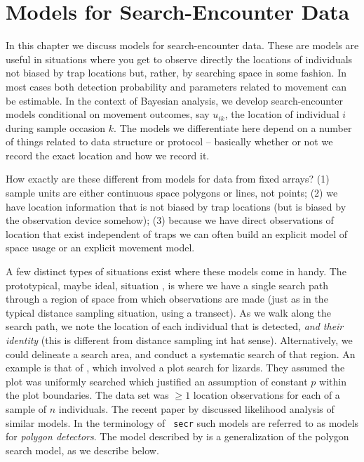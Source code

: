\chapter{Models for  Search-Encounter Data}
\label{chapt.search-encounter}

\vspace{0.3cm}


In this chapter we discuss models for search-encounter data. These are
models are useful in situations where you get to observe directly the
locations of individuals not biased by trap locations but, rather, by
searching space in some fashion. In most cases both detection
probability and parameters related to movement can be estimable. In
the context of Bayesian analysis, we develop search-encounter models
conditional on movement outcomes, say $u_{ik}$, the location of
individual $i$ during sample occasion $k$.  The models we
differentiate here depend on a number of things related to data
structure or protocol -- basically whether or not we record the exact
location and how we record it.

How exactly are these different from models for data from fixed
arrays?  (1) sample units are either continuous space polygons or
lines, not points; (2) we have location information that is not biased
by trap locations (but is biased by the observation device somehow);
(3) because we have direct observations of location that exist
independent of traps we can often build an explicit model of space
usage or an explicit movement model.

A few distinct types of situations exist where these models come in
handy. The prototypical, maybe ideal, situation
\citet{royle_etal:2011mee}, is where we have a single search path
through a region of space from which observations are made (just as in
the typical distance sampling situation, using a transect). As we walk
along the search path, we note the location of each individual that is
detected, {\it and their identity} (this is different from distance
sampling int hat sense). Alternatively, we could delineate a search
area, and conduct a systematic search of that region.  An example is
that of \citet{royle_young:2008}, which involved a plot search for
lizards. They assumed the plot was uniformly searched which justified
an assumption of constant $p$ within the plot boundaries. The data set
was $\ge 1$ location observations for each of a sample of $n$
individuals.  The recent paper by \citet{efford:2011} discussed
likelihood analysis of similar models. In the terminology of \mbox{\tt
  secr} such models are referred to as models for {\it polygon
  detectors}.  The model described by \citep{royle_etal:2011mee} is a
generalization of the polygon search model, as we describe below.


